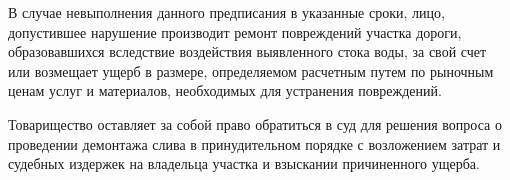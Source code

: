 
В случае невыполнения данного предписания в указанные сроки, лицо, допустившее нарушение  производит ремонт повреждений участка дороги, образовавшихся вследствие воздействия выявленного стока воды, за свой счет или возмещает ущерб в размере, определяемом расчетным путем по рыночным ценам услуг и материалов, необходимых для устранения повреждений.

Товарищество оставляет за собой право обратиться в суд для решения вопроса о проведении демонтажа слива в принудительном порядке с возложением затрат и судебных издержек на владельца участка   и взыскании причиненного ущерба.



 

%
%
%
%


